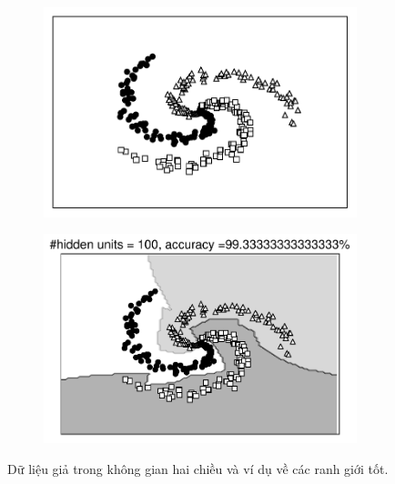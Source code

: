  \begin{figure}[t]
     \begin{subfigure}{0.45\textwidth}
     \includegraphics[width=0.99\linewidth]{ebookML_src/src/mlp/EX.pdf}
     \caption{}
     \label{fig:14_7a}
     \end{subfigure}
     \begin{subfigure}{0.45\textwidth}
     \includegraphics[width=0.99\linewidth]{ebookML_src/src/mlp/ex_res100.pdf}
     \caption{}
     \label{fig:14_7b}
     \end{subfigure}
     \caption{
     Dữ liệu giả trong không gian hai chiều và ví dụ về các ranh giới tốt.  
     }
     \label{fig:14_7}
 \end{figure}
  
